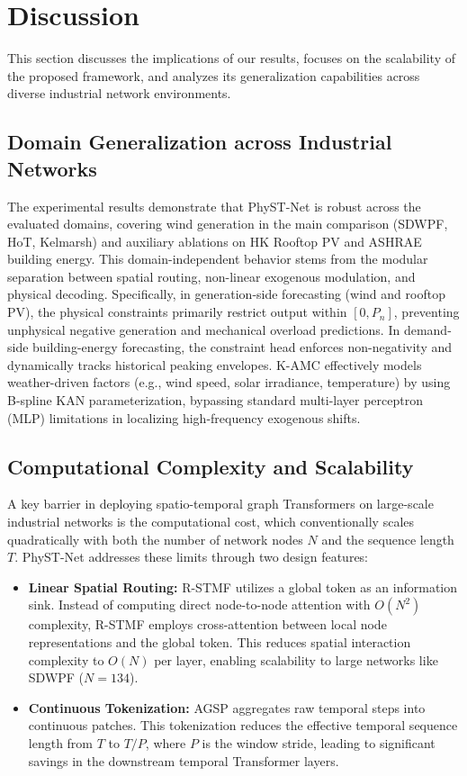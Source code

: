 \section{Discussion}
\label{sec:discussion}

This section discusses the implications of our results, focuses on the scalability of the proposed framework, and analyzes its generalization capabilities across diverse industrial network environments.

\subsection{Domain Generalization across Industrial Networks}
The experimental results demonstrate that PhyST-Net is robust across the evaluated domains, covering wind generation in the main comparison (SDWPF, HoT, Kelmarsh) and auxiliary ablations on HK Rooftop PV and ASHRAE building energy. This domain-independent behavior stems from the modular separation between spatial routing, non-linear exogenous modulation, and physical decoding. 
Specifically, in generation-side forecasting (wind and rooftop PV), the physical constraints primarily restrict output within $[0, P_n]$, preventing unphysical negative generation and mechanical overload predictions. In demand-side building-energy forecasting, the constraint head enforces non-negativity and dynamically tracks historical peaking envelopes. K-AMC effectively models weather-driven factors (e.g., wind speed, solar irradiance, temperature) by using B-spline KAN parameterization, bypassing standard multi-layer perceptron (MLP) limitations in localizing high-frequency exogenous shifts.

\subsection{Computational Complexity and Scalability}
A key barrier in deploying spatio-temporal graph Transformers on large-scale industrial networks is the computational cost, which conventionally scales quadratically with both the number of network nodes $N$ and the sequence length $T$. PhyST-Net addresses these limits through two design features:
\begin{itemize}
    \item \textbf{Linear Spatial Routing:} R-STMF utilizes a global token as an information sink. Instead of computing direct node-to-node attention with $O(N^2)$ complexity, R-STMF employs cross-attention between local node representations and the global token. This reduces spatial interaction complexity to $O(N)$ per layer, enabling scalability to large networks like SDWPF ($N=134$).
    \item \textbf{Continuous Tokenization:} AGSP aggregates raw temporal steps into continuous patches. This tokenization reduces the effective temporal sequence length from $T$ to $T/P$, where $P$ is the window stride, leading to significant savings in the downstream temporal Transformer layers.
\end{itemize}

